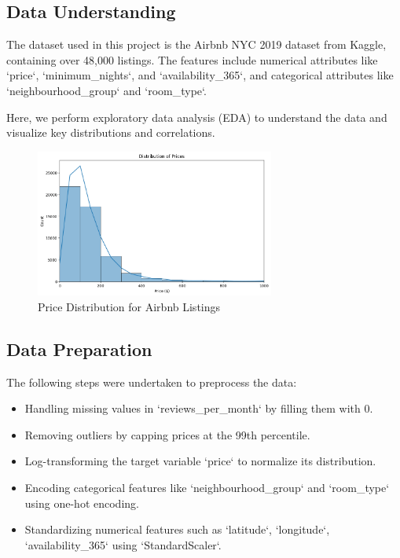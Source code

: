 \documentclass{article}
\begin{document}
\subsection{Data Understanding}
The dataset used in this project is the Airbnb NYC 2019 dataset from Kaggle, containing over 48,000 listings. The features include numerical attributes like `price`, `minimum\_nights`, and `availability\_365`, and categorical attributes like `neighbourhood\_group` and `room\_type`.

Here, we perform exploratory data analysis (EDA) to understand the data and visualize key distributions and correlations.

\begin{figure}[h!]
    \centering
    \includegraphics[width=0.7\textwidth]{price_distribution.png}
    \caption{Price Distribution for Airbnb Listings}
\end{figure}

\subsection{Data Preparation}
The following steps were undertaken to preprocess the data:
\begin{itemize}
    \item Handling missing values in `reviews\_per\_month` by filling them with 0.
    \item Removing outliers by capping prices at the 99th percentile.
    \item Log-transforming the target variable `price` to normalize its distribution.
    \item Encoding categorical features like `neighbourhood\_group` and `room\_type` using one-hot encoding.
    \item Standardizing numerical features such as `latitude`, `longitude`, `availability\_365` using `StandardScaler`.
\end{itemize}
\end{document}
